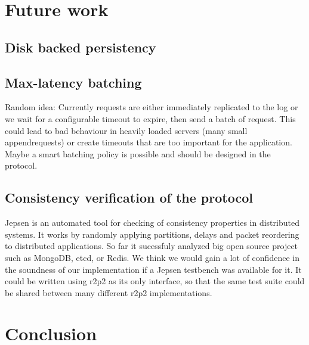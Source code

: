 \chapter{Future work}

\section{Disk backed persistency}

\section{Max-latency batching}

Random idea: Currently requests are either immediately replicated to the log or we wait for a configurable timeout to expire, then send a batch of request.
This could lead to bad behaviour in heavily loaded servers (many small appendrequests) or create timeouts that are too important for the application.
Maybe a smart batching policy is possible and should be designed in the protocol.

\section{Consistency verification of the protocol}

Jepsen\cite{jepsen} is an automated tool for checking of consistency properties in distributed systems.
It works by randomly applying partitions, delays and packet reordering to distributed applications.
So far it sucessfuly analyzed big open source project such as MongoDB, etcd, or Redis.
We think we would gain a lot of confidence in the soundness of our implementation if a Jepsen testbench was available for it.
It could be written using \gls{r2p2} as its only interface, so that the same test suite could be shared between many different \gls{r2p2} implementations.

\chapter{Conclusion}


